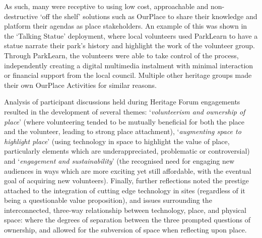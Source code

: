 As such, many were receptive to using low cost, approachable and non-destructive `off the shelf' solutions such as OurPlace to share their knowledge and platform their agendas as place stakeholders. An example of this was shown in the `Talking Statue' deployment, where local volunteers used ParkLearn to have a statue narrate their park's history and highlight the work of the volunteer group. Through ParkLearn, the volunteers were able to take control of the process, independently creating a digital multimedia instalment with minimal interaction or financial support from the local council. Multiple other heritage groups made their own OurPlace Activities for similar reasons.

Analysis of participant discussions held during Heritage Forum engagements resulted in the development of several themes: `\textit{volunteerism and ownership of place}' (where volunteering tended to be mutually beneficial for both the place and the volunteer, leading to strong place attachment), `\textit{augmenting space to highlight place}' (using technology in space to highlight the value of place, particularly elements which are underappreciated, problematic or controversial) and `\textit{engagement and sustainability}' (the recognised need for engaging new audiences in ways which are more exciting yet still affordable, with the eventual goal of acquiring new volunteers). Finally, further reflections noted the prestige attached to the integration of cutting edge technology in sites (regardless of it being a questionable value proposition), and issues surrounding the interconnected, three-way relationship between technology, place, and physical space: where the degrees of separation between the three prompted questions of ownership, and allowed for the subversion of space when reflecting upon place.